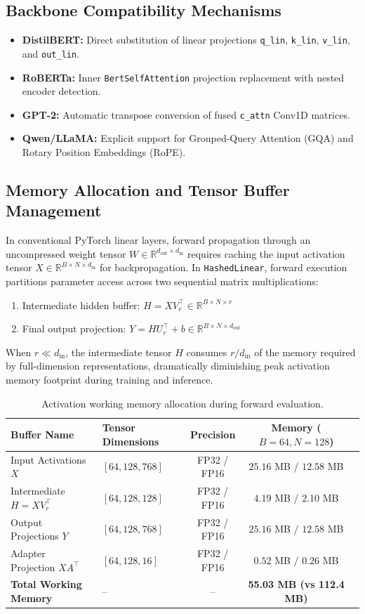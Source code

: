 \subsection{Backbone Compatibility Mechanisms}
\begin{itemize}
\item \textbf{DistilBERT:} Direct substitution of linear projections \texttt{q\_lin}, \texttt{k\_lin}, \texttt{v\_lin}, and \texttt{out\_lin}.
\item \textbf{RoBERTa:} Inner \texttt{BertSelfAttention} projection replacement with nested encoder detection.
\item \textbf{GPT-2:} Automatic transpose conversion of fused \texttt{c\_attn} Conv1D matrices.
\item \textbf{Qwen/LLaMA:} Explicit support for Grouped-Query Attention (GQA) and Rotary Position Embeddings (RoPE).
\end{itemize}

\subsection{Memory Allocation and Tensor Buffer Management}
In conventional PyTorch linear layers, forward propagation through an uncompressed weight tensor $W \in \mathbb{R}^{d_{\text{out}} \times d_{\text{in}}}$ requires caching the input activation tensor $X \in \mathbb{R}^{B \times N \times d_{\text{in}}}$ for backpropagation. In \texttt{HashedLinear}, forward execution partitions parameter access across two sequential matrix multiplications:
\begin{enumerate}
\item Intermediate hidden buffer: $H = X V_r^\top \in \mathbb{R}^{B \times N \times r}$
\item Final output projection: $Y = H U_r^\top + b \in \mathbb{R}^{B \times N \times d_{\text{out}}}$
\end{enumerate}
When $r \ll d_{\text{in}}$, the intermediate tensor $H$ consumes $r / d_{\text{in}}$ of the memory required by full-dimension representations, dramatically diminishing peak activation memory footprint during training and inference.

\begin{table}[H]
\centering
\small
\begin{tabular}{llccc}
\toprule
\textbf{Buffer Name} & \textbf{Tensor Dimensions} & \textbf{Precision} & \textbf{Memory ($B=64, N=128$)} \\
\midrule
Input Activations $X$ & $[64, 128, 768]$ & FP32 / FP16 & $25.16$ MB / $12.58$ MB \\
Intermediate $H = X V_r^\top$ & $[64, 128, 128]$ & FP32 / FP16 & $4.19$ MB / $2.10$ MB \\
Output Projections $Y$ & $[64, 128, 768]$ & FP32 / FP16 & $25.16$ MB / $12.58$ MB \\
Adapter Projection $X A^\top$ & $[64, 128, 16]$ & FP32 / FP16 & $0.52$ MB / $0.26$ MB \\
\midrule
\textbf{Total Working Memory} & -- & -- & \textbf{55.03 MB (vs 112.4 MB)} \\
\bottomrule
\end{tabular}
\caption{Activation working memory allocation during forward evaluation.}
\end{table}
